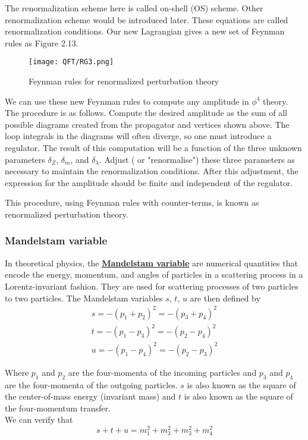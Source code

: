 The renormalization scheme here is called on-shell (OS) scheme. Other renormalization scheme would be introduced later.
These equations are called renormalization conditions.
Our new Lagrangian gives a new set of Feynman rules as Figure 2.13.
\begin{figure}[!h]
\centering
\texttt{[image: QFT/RG3.png]}
\caption{Feynman rules for renormalized perturbation theory}
\end{figure}

We can use these new Feynman rules to compute any amplitude in $\phi^4$ theory. The procedure is as follows. Compute the desired amplitude as the sum of all possible diagrams created from the propagator and vertices shown above. The loop integrals in the diagrams will often diverge, so one must introduce a regulator. The result of this computation will be a function of the three unknown parameters $\delta_Z$, $\delta_m$, and $\delta_{\lambda}$. Adjust ( or "renormalise") these three parameters as necessary to maintain the renormalization conditions. After this adjustment, the expression for the amplitude should be finite and independent of the regulator.

This procedure, using Feynman rules with counter-terms, is known as renormalized perturbation theory. 

\subsubsection{Mandelstam variable}
In theoretical physics, the \href{https://en.wikipedia.org/wiki/Mandelstam_variables}{\textbf{Mandelstam variable}}  are numerical quantities that encode the energy, momentum, and angles of particles in a scattering process in a Lorentz-invariant fashion. They are used for scattering processes of two particles to two particles. 
The Mandelstam variables $s$, $t$, $u$ are then defined by
\begin{eqnarray}
s=-(p_{1}+p_{2})^{2}=-(p_{3}+p_{4})^{2} \nonumber \\
t=-(p_{1}-p_{3})^{2}=-(p_{2}-p_{4})^{2} \nonumber \\
u=-(p_{1}-p_{4})^{2}=-(p_{2}-p_{3})^{2} \nonumber
\end{eqnarray}

Where $p_1$ and $p_2$ are the four-momenta of the incoming particles and $p_3$ and $p_4$ are the four-momenta of the outgoing particles.
$s$ is also known as the square of the center-of-mass energy (invariant mass) and $t$ is also known as the square of the four-momentum transfer.\\
We can verify that
\[s+t+u = m_1^2 + m_3^2 + m_3^2 +m_4^2\]

